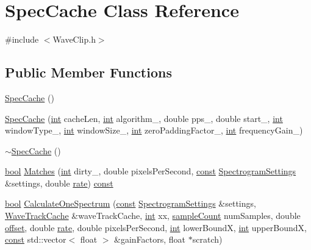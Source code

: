 \hypertarget{class_spec_cache}{}\section{Spec\+Cache Class Reference}
\label{class_spec_cache}


{\ttfamily \#include $<$Wave\+Clip.\+h$>$}

\subsection*{Public Member Functions}
\begin{DoxyCompactItemize}
\item 
\hyperlink{class_spec_cache_a3e0e36f634439bbc55f41d5173b83f39}{Spec\+Cache} ()
\item 
\hyperlink{class_spec_cache_a1b78b3358e3e66d7fd0baa4faef9f389}{Spec\+Cache} (\hyperlink{xmltok_8h_a5a0d4a5641ce434f1d23533f2b2e6653}{int} cache\+Len, \hyperlink{xmltok_8h_a5a0d4a5641ce434f1d23533f2b2e6653}{int} algorithm\+\_\+, double pps\+\_\+, double start\+\_\+, \hyperlink{xmltok_8h_a5a0d4a5641ce434f1d23533f2b2e6653}{int} window\+Type\+\_\+, \hyperlink{xmltok_8h_a5a0d4a5641ce434f1d23533f2b2e6653}{int} window\+Size\+\_\+, \hyperlink{xmltok_8h_a5a0d4a5641ce434f1d23533f2b2e6653}{int} zero\+Padding\+Factor\+\_\+, \hyperlink{xmltok_8h_a5a0d4a5641ce434f1d23533f2b2e6653}{int} frequency\+Gain\+\_\+)
\item 
\hyperlink{class_spec_cache_a8089eb014eb17d5df89d9c63ec8c7624}{$\sim$\+Spec\+Cache} ()
\item 
\hyperlink{mac_2config_2i386_2lib-src_2libsoxr_2soxr-config_8h_abb452686968e48b67397da5f97445f5b}{bool} \hyperlink{class_spec_cache_a42bd29a8018fb13326ee2176faab5ef8}{Matches} (\hyperlink{xmltok_8h_a5a0d4a5641ce434f1d23533f2b2e6653}{int} dirty\+\_\+, double pixels\+Per\+Second, \hyperlink{getopt1_8c_a2c212835823e3c54a8ab6d95c652660e}{const} \hyperlink{class_spectrogram_settings}{Spectrogram\+Settings} \&settings, double \hyperlink{seqread_8c_ad89d3fac2deab7a9cf6cfc8d15341b85}{rate}) \hyperlink{getopt1_8c_a2c212835823e3c54a8ab6d95c652660e}{const} 
\item 
\hyperlink{mac_2config_2i386_2lib-src_2libsoxr_2soxr-config_8h_abb452686968e48b67397da5f97445f5b}{bool} \hyperlink{class_spec_cache_a376eb7e6dc1e393b51a9eb48dafe9c6a}{Calculate\+One\+Spectrum} (\hyperlink{getopt1_8c_a2c212835823e3c54a8ab6d95c652660e}{const} \hyperlink{class_spectrogram_settings}{Spectrogram\+Settings} \&settings, \hyperlink{class_wave_track_cache}{Wave\+Track\+Cache} \&wave\+Track\+Cache, \hyperlink{xmltok_8h_a5a0d4a5641ce434f1d23533f2b2e6653}{int} xx, \hyperlink{include_2audacity_2_types_8h_afa427e1f521ea5ec12d054e8bd4d0f71}{sample\+Count} num\+Samples, double \hyperlink{layer12_8c_a33d71f23ba2052d17f0b754dc35265b0}{offset}, double \hyperlink{seqread_8c_ad89d3fac2deab7a9cf6cfc8d15341b85}{rate}, double pixels\+Per\+Second, \hyperlink{xmltok_8h_a5a0d4a5641ce434f1d23533f2b2e6653}{int} lower\+BoundX, \hyperlink{xmltok_8h_a5a0d4a5641ce434f1d23533f2b2e6653}{int} upper\+BoundX, \hyperlink{getopt1_8c_a2c212835823e3c54a8ab6d95c652660e}{const} std\+::vector$<$ float $>$ \&gain\+Factors, float $\ast$scratch)

\end{DoxyCompactItemize}
